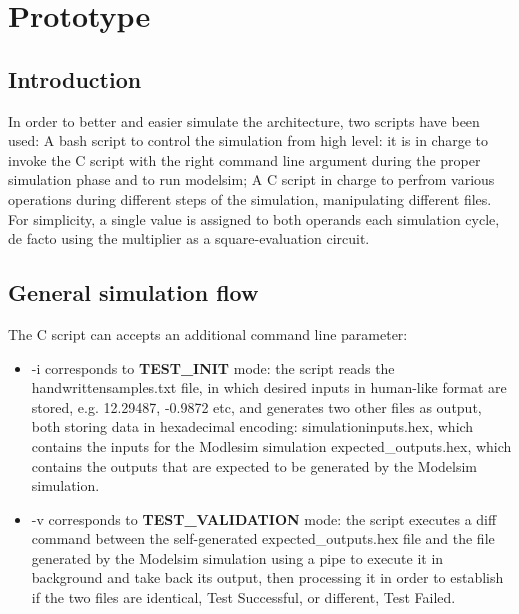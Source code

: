 %
\chapter{Prototype}
\label{chap1}
\graphicspath{ {./chapters/chap1images/} }
\section{Introduction}
In order to better and easier simulate the architecture, two scripts have been used:
A bash script to control the simulation from high level: it is in charge to invoke the C script with the right command line argument during the proper simulation phase and to 
run modelsim;
A C script in charge to perfrom various operations during different steps of the simulation, manipulating different files.
For simplicity, a single value is assigned to both operands each simulation cycle, de facto using the multiplier as a square-evaluation circuit.
\section{General simulation flow}
The C script can accepts an additional command line parameter:\begin{itemize}
    \item -i corresponds to \textbf{TEST\_INIT} mode: the script reads the handwrittensamples.txt file, in which desired inputs in human-like format are stored, e.g. 12.29487, -0.9872 etc, 
    and generates two other files as output, both storing data in hexadecimal encoding:
    simulationinputs.hex, which contains the inputs for the Modlesim simulation
    expected\_outputs.hex, which contains the outputs that are expected to be generated by the Modelsim simulation.
    \item -v corresponds to \textbf{TEST\_VALIDATION} mode: the script executes a diff command between the self-generated expected\_outputs.hex file and the file generated by the Modelsim simulation using 
    a pipe to execute it in background and take back its output, then processing it in order to establish if the two files are identical, Test Successful, or different, Test Failed.
    
    \end{itemize} 


